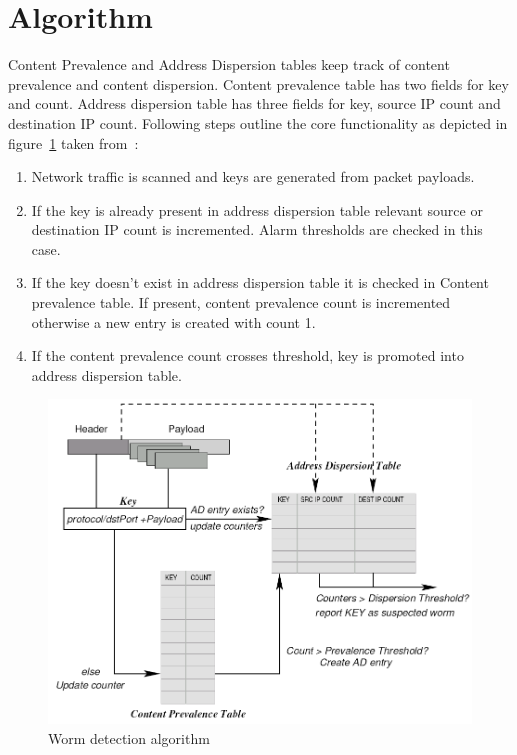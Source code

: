 \documentclass{report}
\begin{document}
\section{Algorithm}
Content Prevalence and Address Dispersion tables keep track of content prevalence and content dispersion. Content prevalence table has two fields for key and count. Address dispersion table has three fields for key, source IP count and destination IP count. Following steps outline the core functionality as depicted in figure~\ref{Algorithm} taken from~\cite{DBLP:conf/osdi/SinghEVS04}:
\begin{enumerate}
\item Network traffic is scanned and keys are generated from packet payloads.
\item If the key is already present in address dispersion table relevant source or destination IP count is incremented. Alarm thresholds are checked in this case.
\item If the key doesn't exist in address dispersion table it is checked in Content prevalence table. If present, content prevalence count is incremented otherwise a new entry is created with count 1. 
\item If the content prevalence count crosses threshold, key is promoted into address dispersion table.
\end{enumerate}

\begin{figure}[here]
\centering
\includegraphics[width=\textwidth]{Algorithm.png}
\caption{Worm detection algorithm}
\label{Algorithm}
\end{figure}
\end{document}
